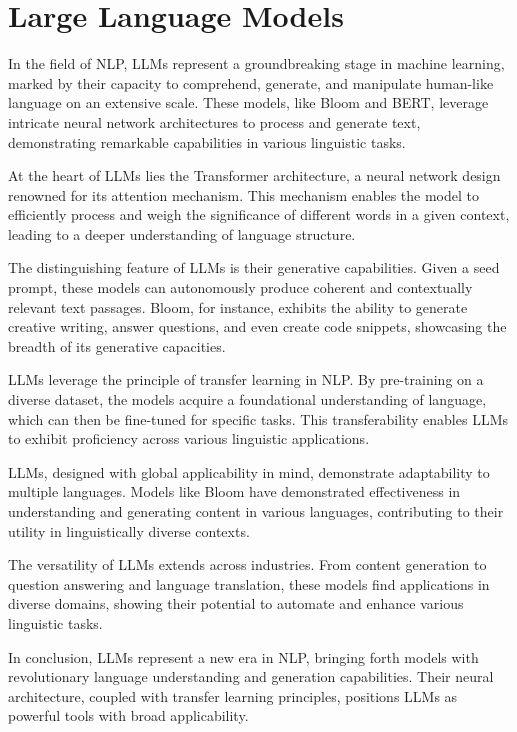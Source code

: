 \section{Large Language Models}

In the field of NLP, LLMs represent a groundbreaking stage in machine learning, marked by their capacity to comprehend, generate, and manipulate human-like language on an extensive scale. These models, like Bloom and BERT, leverage intricate neural network architectures to process and generate text, demonstrating remarkable capabilities in various linguistic tasks.\cite{zhao2023survey}

At the heart of LLMs lies the Transformer architecture, a neural network design renowned for its attention mechanism. This mechanism enables the model to efficiently process and weigh the significance of different words in a given context, leading to a deeper understanding of language structure.

The distinguishing feature of LLMs is their generative capabilities. Given a seed prompt, these models can autonomously produce coherent and contextually relevant text passages. Bloom, for instance, exhibits the ability to generate creative writing, answer questions, and even create code snippets, showcasing the breadth of its generative capacities.

LLMs leverage the principle of transfer learning in NLP. By pre-training on a diverse dataset, the models acquire a foundational understanding of language, which can then be fine-tuned for specific tasks. This transferability enables LLMs to exhibit proficiency across various linguistic applications.

LLMs, designed with global applicability in mind, demonstrate adaptability to multiple languages. Models like Bloom have demonstrated effectiveness in understanding and generating content in various languages, contributing to their utility in linguistically diverse contexts.

The versatility of LLMs extends across industries. From content generation to question answering and language translation, these models find applications in diverse domains, showing their potential to automate and enhance various linguistic tasks.

In conclusion, LLMs represent a new era in NLP, bringing forth models with revolutionary language understanding and generation capabilities. Their neural architecture, coupled with transfer learning principles, positions LLMs as powerful tools with broad applicability.

